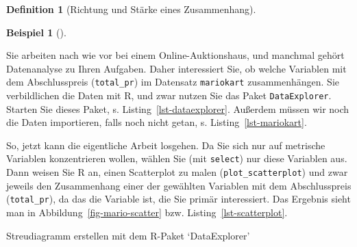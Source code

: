 \documentclass[
  a4paper,
  DIV=11]{scrreprt}
\newenvironment{Shaded}{\begin{snugshade}}{\end{snugshade}}
\newcommand{\AttributeTok}[1]{\textcolor[rgb]{0.40,0.45,0.13}{#1}}
\newcommand{\FunctionTok}[1]{\textcolor[rgb]{0.28,0.35,0.67}{#1}}
\newcommand{\NormalTok}[1]{\textcolor[rgb]{0.00,0.23,0.31}{#1}}
\newcommand{\SpecialCharTok}[1]{\textcolor[rgb]{0.37,0.37,0.37}{#1}}
\newcommand{\StringTok}[1]{\textcolor[rgb]{0.13,0.47,0.30}{#1}}
\theoremstyle{definition}
\theoremstyle{definition}
\newtheorem{example}{Beispiel}[chapter]
\theoremstyle{definition}
\newtheorem{definition}{Definition}[chapter]
\theoremstyle{remark}
\begin{document}
\begin{definition}[Richtung und Stärke eines
Zusammenhang]
\begin{example}[]\protect\hypertarget{exm-scatter}{}\label{exm-scatter}

Sie arbeiten nach wie vor bei einem Online-Auktionshaus, und manchmal
gehört Datenanalyse zu Ihren Aufgaben. Daher interessiert Sie, ob welche
Variablen mit dem Abschlusspreis (\texttt{total\_pr}) im Datensatz
\texttt{mariokart} zusammenhängen. Sie verbildlichen die Daten mit R,
und zwar nutzen Sie das Paket \texttt{DataExplorer}. Starten Sie dieses
Paket, s. Listing~\ref{lst-dataexplorer}. Außerdem müssen wir noch die
Daten importieren, falls noch nicht getan, s.
Listing~\ref{lst-mariokart}.

So, jetzt kann die eigentliche Arbeit losgehen. Da Sie sich nur auf
metrische Variablen konzentrieren wollen, wählen Sie (mit
\texttt{select}) nur diese Variablen aus. Dann weisen Sie R an, einen
Scatterplot zu malen (\texttt{plot\_scatterplot}) und zwar jeweils den
Zusammenhang einer der gewählten Variablen mit dem Abschlusspreis
(\texttt{total\_pr}), da das die Variable ist, die Sie primär
interessiert. Das Ergebnis sieht man in
Abbildung~\ref{fig-mario-scatter} bzw. Listing~\ref{lst-scatterplot}.

\begin{codelisting}

\caption{\label{lst-scatterplot}Streudiagramm erstellen mit dem R-Paket
`DataExplorer'}

\centering{

\begin{Shaded}
\begin{Highlighting}[]
\NormalTok{mariokart }\SpecialCharTok{\%\textgreater{}\%} 
  \FunctionTok{select}\NormalTok{(duration, n\_bids, start\_pr,}
\NormalTok{         ship\_pr, total\_pr, }
\NormalTok{         seller\_rate, wheels) }\SpecialCharTok{\%\textgreater{}\%} 
  \FunctionTok{plot\_scatterplot}\NormalTok{(}\AttributeTok{by =} \StringTok{"total\_pr"}\NormalTok{)}
\end{Highlighting}
\end{Shaded}

}

\end{codelisting}%

\begin{figure}[H]

\centering{

}
\end{figure}
\end{example}
\end{definition}
\end{document}
